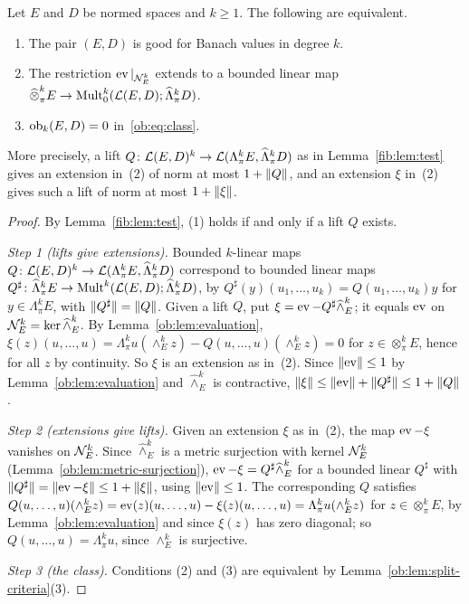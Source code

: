 \begin{theorem}\label{ob:thm:obstruction}
Let $E$ and $D$ be normed spaces and $k\ge1$. The following are equivalent.
\begin{enumerate}
\item The pair $(E,D)$ is good for Banach values in degree $k$.
\item The restriction $\operatorname{ev}|_{\mathcal N^k_E}$ extends to a bounded linear map
$\widehat\otimes^k_\pi E\to\operatorname{Mult}^k_0(\mathcal L(E,D);\widehat\Lambda^k_\pi D)$.
\item $\operatorname{ob}_k(E,D)=0$ in~\eqref{ob:eq:class}.
\end{enumerate}
More precisely, a lift $Q\colon\mathcal L(E,D)^k\to\mathcal L(\Lambda^k_\pi E,\widehat\Lambda^k_\pi D)$ as in
Lemma~\ref{fib:lem:test} gives an extension in~(2) of norm at most $1+\lVert Q\rVert$, and an extension $\xi$ in~(2) gives such a
lift of norm at most $1+\lVert \xi\rVert$.
\end{theorem}

\begin{proof}
By Lemma~\ref{fib:lem:test}, (1) holds if and only if a lift $Q$ exists.

\emph{Step 1 (lifts give extensions).} Bounded $k$-linear maps
$Q\colon\mathcal L(E,D)^k\to\mathcal L(\Lambda^k_\pi E,\widehat\Lambda^k_\pi D)$ correspond to bounded linear maps
$Q^\sharp\colon\widehat\Lambda^k_\pi E\to\operatorname{Mult}^k(\mathcal L(E,D);\widehat\Lambda^k_\pi D)$, by
$Q^\sharp(y)(u_1,\dots,u_k)=Q(u_1,\dots,u_k)y$ for $y\in\Lambda^k_\pi E$, with $\lVert Q^\sharp\rVert=\lVert Q\rVert$. Given a lift $Q$,
put $\xi=\operatorname{ev}-Q^\sharp\widehat\wedge^k_E$; it equals $\operatorname{ev}$ on $\mathcal N^k_E=\ker\widehat\wedge^k_E$. By
Lemma~\ref{ob:lem:evaluation}, $\xi(z)(u,\dots,u)=\Lambda^k_\pi u(\wedge^k_Ez)-Q(u,\dots,u)(\wedge^k_Ez)=0$ for
$z\in\otimes^k_\pi E$, hence for all $z$ by continuity. So $\xi$ is an extension as in~(2). Since $\lVert \operatorname{ev}\rVert\le1$ by
Lemma~\ref{ob:lem:evaluation} and $\widehat\wedge^k_E$ is contractive, $\lVert \xi\rVert\le\lVert \operatorname{ev}\rVert+\lVert Q^\sharp\rVert\le1+\lVert Q\rVert$.

\emph{Step 2 (extensions give lifts).} Given an extension $\xi$ as in~(2), the map $\operatorname{ev}-\xi$ vanishes on $\mathcal N^k_E$. Since $\widehat\wedge^k_E$ is a
metric surjection with kernel $\mathcal N^k_E$ (Lemma~\ref{ob:lem:metric-surjection}), $\operatorname{ev}-\xi=Q^\sharp\widehat\wedge^k_E$ for a
bounded linear $Q^\sharp$ with $\lVert Q^\sharp\rVert=\lVert \operatorname{ev}-\xi\rVert\le1+\lVert \xi\rVert$, using $\lVert \operatorname{ev}\rVert\le1$. The corresponding $Q$
satisfies $Q(u,\dots,u)(\wedge^k_Ez)=\operatorname{ev}(z)(u,\dots,u)-\xi(z)(u,\dots,u)=\Lambda^k_\pi u(\wedge^k_Ez)$ for
$z\in\otimes^k_\pi E$, by Lemma~\ref{ob:lem:evaluation} and since $\xi(z)$ has zero diagonal; so
$Q(u,\dots,u)=\Lambda^k_\pi u$, since $\wedge^k_E$ is surjective.

\emph{Step 3 (the class).} Conditions (2) and (3) are equivalent by Lemma~\ref{ob:lem:split-criteria}(3).
\end{proof}

